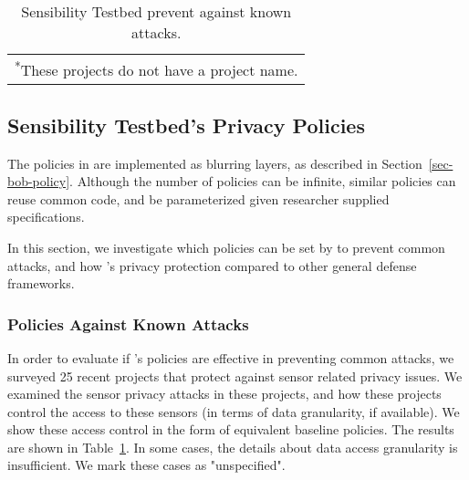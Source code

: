 \begin{table}
\begin{tabular}{|l|l|l|}
\multicolumn{3}{l}{\textsuperscript{*}\scriptsize These projects do not have a project name.} \\ 


\end{tabular}
\egroup

\caption{\small Sensibility Testbed prevent against known attacks. 
}
\label{tab:policy}
\end{table}

\subsection{Sensibility Testbed's Privacy Policies}\label{sec-our-policies}

The policies in \sysname are implemented as blurring layers, as described
in Section~\ref{sec-bob-policy}. Although the number of policies can be
infinite, similar policies can reuse common code, and be parameterized 
given researcher supplied specifications. 

In this section, we investigate which policies can be set by \sysname to 
prevent common attacks, and how \sysname's privacy protection compared 
to other general defense frameworks.

\subsubsection{Policies Against Known Attacks}
In order to evaluate if \sysname's policies are effective in preventing common 
attacks, we surveyed 25 recent projects that 
protect against sensor related privacy issues. We examined the sensor 
privacy attacks in these projects, and how these projects control the access 
to these sensors (in terms of data granularity, if available). We show these access control 
in the form of equivalent \sysname baseline policies. The results are shown in 
Table~\ref{tab:policy}. In some cases, the details about data access granularity
is insufficient. We mark these cases as "unspecified". 

